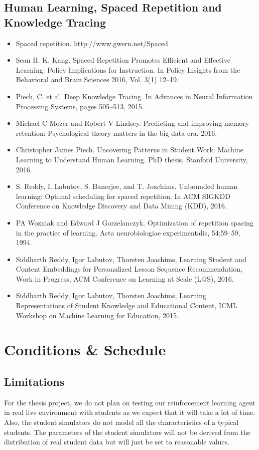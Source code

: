 \documentclass[12pt]{article}
\begin{document}
\subsection{Human Learning, Spaced Repetition and Knowledge Tracing}
\begin{itemize}
    \item Spaced repetition. http://www.gwern.net/Spaced%
    \item Sean H. K. Kang. Spaced Repetition Promotes Efficient and Effective Learning: Policy Implications for Instruction. In Policy Insights from the Behavioral and Brain Sciences 2016, Vol. 3(1) 12–19.
    \item Piech, C. et al. Deep Knowledge Tracing. In Advances in Neural Information Processing Systems, pages 505–513, 2015.
    \item Michael C Mozer and Robert V Lindsey. Predicting and improving memory retention: Psychological theory matters in the big data era, 2016.
    \item Christopher James Piech. Uncovering Patterns in Student Work: Machine Learning to Understand Human Learning. PhD thesis, Stanford University, 2016.
    \item S. Reddy, I. Labutov, S. Banerjee, and T. Joachims. Unbounded human learning: Optimal scheduling for spaced repetition. In ACM SIGKDD Conference on Knowledge Discovery and Data Mining (KDD), 2016.
    \item PA Wozniak and Edward J Gorzelanczyk. Optimization of repetition spacing in the practice of learning. Acta neurobiologiae experimentalis, 54:59–59, 1994.
    \item Siddharth Reddy, Igor Labutov, Thorsten Joachims, Learning Student and Content Embeddings for Personalized Lesson Sequence Recommendation, Work in Progress, ACM Conference on Learning at Scale (L@S), 2016.
    \item Siddharth Reddy, Igor Labutov, Thorsten Joachims, Learning Representations of Student Knowledge and Educational Content, ICML Workshop on Machine Learning for Education, 2015.
\end{itemize}

\section{Conditions \& Schedule}
\subsection{Limitations}
For the thesis project, we do not plan 	on testing our {\color{blue}reinforcement learning agent in real live environment with students as we expect that it will take a lot of time.} Also, the student simulators do not model all the characteristics of a typical students. The parameters of the student simulators will not be derived from the distribution of real student data but will just be set to reasonable values.
\end{document}
